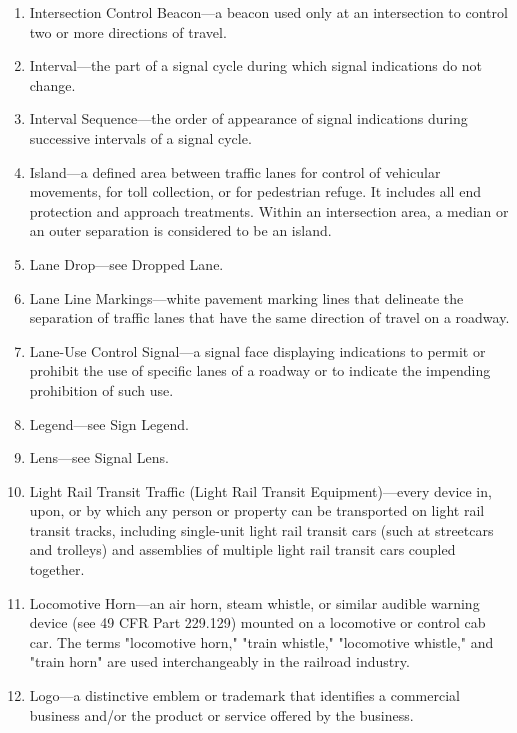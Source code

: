 \documentclass[9pt]{memoir}
\begin{document}
{\begin{enumerate}[label=\arabic*., ref=\arabic*]
\begin{enumerate}[label=\alph*., ref=(\alph*)]
\begin{enumerate}[label=\arabic*., ref=\arabic*]
\item Where a crosswalk is designated on a roadway on the departure from the intersection, the intersection shall include the area extending to the far side of such crosswalk.
\end{enumerate}
\end{enumerate}
\item Intersection Control Beacon---a beacon used only at an intersection to control two or more directions of travel.
\item Interval---the part of a signal cycle during which signal indications do not change.
\item Interval Sequence---the order of appearance of signal indications during successive intervals of a signal cycle.
\item Island---a defined area between traffic lanes for control of vehicular movements, for toll collection, or for pedestrian refuge. It includes all end protection and approach treatments. Within an intersection area, a median or an outer separation is considered to be an island.
\item Lane Drop---see Dropped Lane.
\item Lane Line Markings---white pavement marking lines that delineate the separation of traffic lanes that have the same direction of travel on a roadway.
\item Lane-Use Control Signal---a signal face displaying indications to permit or prohibit the use of specific lanes of a roadway or to indicate the impending prohibition of such use.
\item Legend---see Sign Legend.
\item Lens---see Signal Lens.
\item Light Rail Transit Traffic (Light Rail Transit Equipment)---every device in, upon, or by which any person or property can be transported on light rail transit tracks, including single-unit light rail transit cars (such at streetcars and trolleys) and assemblies of multiple light rail transit cars coupled together.
\item Locomotive Horn---an air horn, steam whistle, or similar audible warning device (see 49 CFR Part 229.129) mounted on a locomotive or control cab car. The terms "locomotive horn," "train whistle," "locomotive whistle," and "train horn" are used interchangeably in the railroad industry.
\item Logo---a distinctive emblem or trademark that identifies a commercial business and/or the product or service offered by the business.

\end{enumerate}}
\end{document}
